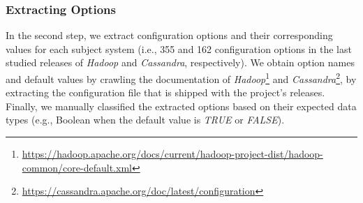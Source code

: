 \subsubsection{Extracting Options}

In the second step, we extract configuration options and their corresponding values for each subject system (i.e., 355 and 162 configuration options in the last studied releases of \emph{Hadoop} and \emph{Cassandra}, respectively). %
We obtain option names and default values by crawling the documentation of \emph{Hadoop}\footnote{\url{https://hadoop.apache.org/docs/current/hadoop-project-dist/hadoop-common/core-default.xml}} and \emph{Cassandra}\footnote{\url{https://cassandra.apache.org/doc/latest/configuration}}, by extracting the configuration file that is shipped with the project's releases. Finally, we manually classified the extracted options based on their expected data types (e.g., Boolean when the default value is \emph{TRUE} or \emph{FALSE}).


